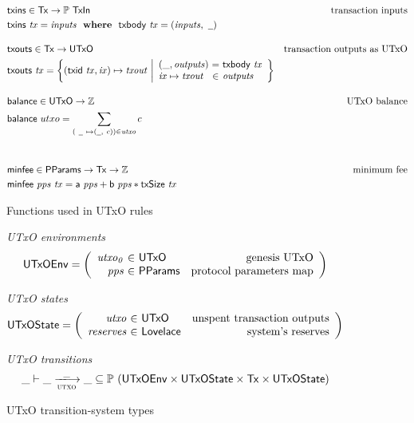 \begin{figure}
  \begin{align*}
    & \fun{txins} \in \Tx \to \powerset{\TxIn}
    & \text{transaction inputs} \\
    & \txins{tx} = \var{inputs} \where \txbody{tx} = (\var{inputs}, ~\wcard)
    \nextdef
    & \fun{txouts} \in \Tx \to \UTxO
    & \text{transaction outputs as UTxO} \\
    & \fun{txouts} ~ \var{tx} =
      \left\{ (\fun{txid} ~ \var{tx}, \var{ix}) \mapsto \var{txout} ~
      \middle| \begin{array}{l@{~}c@{~}l}
                 (\_, \var{outputs}) & = & \txbody{tx} \\
                 \var{ix} \mapsto \var{txout} & \in & \var{outputs}
               \end{array}
      \right\}
    \nextdef
    & \fun{balance} \in \UTxO \to \mathbb{Z}
    & \text{UTxO balance} \\
    & \fun{balance} ~ utxo = \sum_{(~\wcard ~ \mapsto (\wcard, ~c)) \in \var{utxo}} c\\
   \nextdef
    & \fun{minfee} \in \PPMMap \to \Tx \to \mathbb{Z} & \text{minimum fee}\\
    & \fun{minfee}~\var{pps}~\var{tx} =
      \fun{a}~\var{pps} + \fun{b}~\var{pps} * \fun{txSize}~\var{tx}
  \end{align*}
  \caption{Functions used in UTxO rules}
  \label{fig:derived-defs:utxo}
\end{figure}

\begin{figure}
  \emph{UTxO environments}
  \begin{equation*}
    \UTxOEnv =
    \left(
      \begin{array}{r@{~\in~}lr}
        \var{utxo_0} & \UTxO & \text{genesis UTxO}\\
        \var{pps} & \PPMMap & \text{protocol parameters map}
      \end{array}
    \right)
  \end{equation*}

  \emph{UTxO states}
  \begin{equation*}
    \UTxOState =
    \left(
      \begin{array}{r@{~\in~}lr}
        \var{utxo} & \UTxO & \text{unspent transaction outputs}\\
        \var{reserves} & \Lovelace & \text{system's reserves}
      \end{array}
    \right)
  \end{equation*}

  \emph{UTxO transitions}
  \begin{equation*}
    \_ \vdash
    \var{\_} \trans{utxo}{\_} \var{\_}
    \subseteq \powerset (\UTxOEnv \times \UTxOState \times \Tx \times \UTxOState)
  \end{equation*}
  \caption{UTxO transition-system types}
  \label{fig:ts-types:utxo}
\end{figure}


